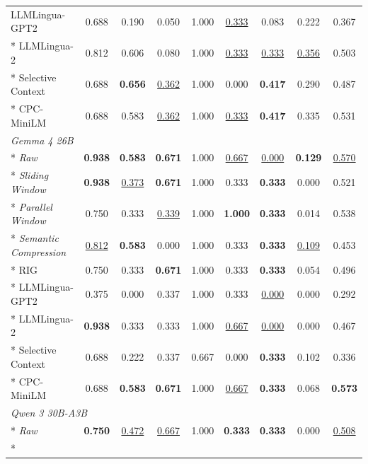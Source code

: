 {\begin{longtable}{lcc|cc|cc|c|c}
LLMLingua-GPT2                 & 0.688 & 0.190 & 0.050 & 1.000 & \underline{0.333} & 0.083 & 0.222 & 0.367 \\*
LLMLingua-2                    & 0.812 & 0.606 & 0.080 & 1.000 & \underline{0.333} & \underline{0.333} & \underline{0.356} & 0.503 \\*
Selective Context              & 0.688 & \textbf{0.656} & \underline{0.362} & 1.000 & 0.000 & \textbf{0.417} & 0.290 & 0.487 \\*
CPC-MiniLM                     & 0.688 & 0.583 & \underline{0.362} & 1.000 & \underline{0.333} & \textbf{0.417} & 0.335 & 0.531 \\
\midrule
\multicolumn{9}{l}{\textit{Gemma 4 26B}} \\*
\textit{Raw}                   & \textbf{0.938} & \textbf{0.583} & \textbf{0.671} & 1.000 & \underline{0.667} & \underline{0.000} & \textbf{0.129} & \underline{0.570} \\*
\textit{Sliding Window}        & \textbf{0.938} & \underline{0.373} & \textbf{0.671} & 1.000 & 0.333 & \textbf{0.333} & 0.000 & 0.521 \\*
\textit{Parallel Window}       & 0.750 & 0.333 & \underline{0.339} & 1.000 & \textbf{1.000} & \textbf{0.333} & 0.014 & 0.538 \\*
\textit{Semantic Compression}  & \underline{0.812} & \textbf{0.583} & 0.000 & 1.000 & 0.333 & \textbf{0.333} & \underline{0.109} & 0.453 \\*
RIG                            & 0.750 & 0.333 & \textbf{0.671} & 1.000 & 0.333 & \textbf{0.333} & 0.054 & 0.496 \\*
LLMLingua-GPT2                 & 0.375 & 0.000 & 0.337 & 1.000 & 0.333 & \underline{0.000} & 0.000 & 0.292 \\*
LLMLingua-2                    & \textbf{0.938} & 0.333 & 0.333 & 1.000 & \underline{0.667} & \underline{0.000} & 0.000 & 0.467 \\*
Selective Context              & 0.688 & 0.222 & 0.337 & 0.667 & 0.000 & \textbf{0.333} & 0.102 & 0.336 \\*
CPC-MiniLM                     & 0.688 & \textbf{0.583} & \textbf{0.671} & 1.000 & \underline{0.667} & \textbf{0.333} & 0.068 & \textbf{0.573} \\
\midrule
\multicolumn{9}{l}{\textit{Qwen 3 30B-A3B}} \\*
\textit{Raw}                   & \textbf{0.750} & \underline{0.472} & \underline{0.667} & 1.000 & \textbf{0.333} & \textbf{0.333} & 0.000 & \underline{0.508} \\*

\end{longtable}}
